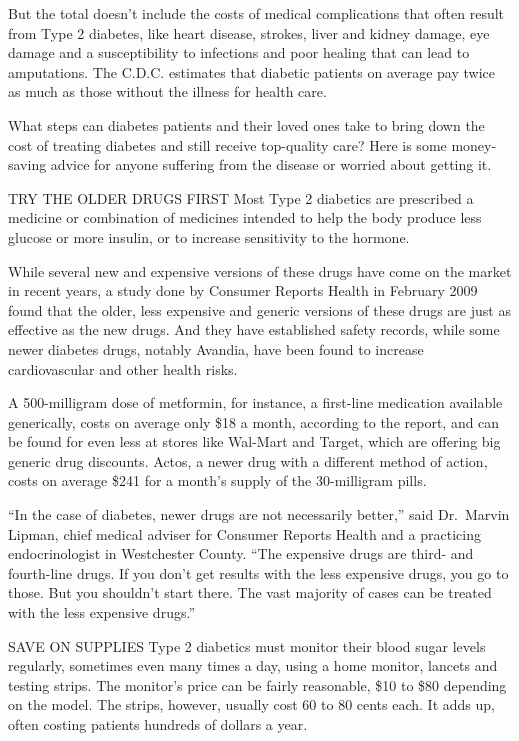 ﻿\documentclass[12pt]{article}
\begin{document}
But the total doesn't include the costs of medical complications that often result from Type 2
diabetes, like heart disease, strokes, liver and kidney damage, eye damage and a susceptibility to
infections and poor healing that can lead to amputations. The C.D.C. estimates that diabetic
patients on average pay twice as much as those without the illness for health care.

What steps can diabetes patients and their loved ones take to bring down the cost of treating
diabetes and still receive top-quality care? Here is some money-saving advice for anyone suffering
from the disease or worried about getting it.

TRY THE OLDER DRUGS FIRST Most Type 2 diabetics are prescribed a medicine or combination of
medicines intended to help the body produce less glucose or more insulin, or to increase sensitivity
to the hormone.

While several new and expensive versions of these drugs have come on the market in recent years, a
study done by Consumer Reports Health in February 2009 found that the older, less expensive and
generic versions of these drugs are just as effective as the new drugs. And they have established
safety records, while some newer diabetes drugs, notably Avandia, have been found to increase
cardiovascular and other health risks.

A 500-milligram dose of metformin, for instance, a first-line medication available generically,
costs on average only \$18 a month, according to the report, and can be found for even less at
stores like Wal-Mart and Target, which are offering big generic drug discounts. Actos, a newer drug
with a different method of action, costs on average \$241 for a month's supply of the 30-milligram
pills.

``In the case of diabetes, newer drugs are not necessarily better,'' said Dr.~Marvin Lipman, chief
medical adviser for Consumer Reports Health and a practicing endocrinologist in Westchester County.
``The expensive drugs are third- and fourth-line drugs. If you don't get results with the less
expensive drugs, you go to those. But you shouldn't start there. The vast majority of cases can be
treated with the less expensive drugs.''

SAVE ON SUPPLIES Type 2 diabetics must monitor their blood sugar levels regularly, sometimes even
many times a day, using a home monitor, lancets and testing strips. The monitor's price can be
fairly reasonable, \$10 to \$80 depending on the model. The strips, however, usually cost 60 to 80
cents each. It adds up, often costing patients hundreds of dollars a year.
\end{document}
